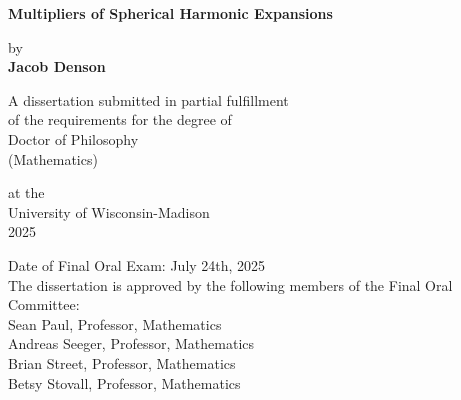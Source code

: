 
\begin{titlepage}
    \begin{center}
        \vspace*{1cm}
        \Huge
        \textbf{Multipliers of Spherical Harmonic Expansions}
    
        \vspace{0.5cm}

        \LARGE
        by\\
        \vspace{0.3em}
        \textbf{Jacob Denson}

        \vfill

        A dissertation submitted in partial fulfillment\\
        of the requirements for the degree of\\
        Doctor of Philosophy\\
        (Mathematics)\\
    
        \vspace{1.8cm}

        \Large
        at the\\University of Wisconsin-Madison\\
        2025\\

        \vspace{1.0cm}
        \begin{flushleft}
        \normalsize
        Date of Final Oral Exam: July 24th, 2025\\
        The dissertation is approved by the following members of the Final Oral Committee: \\
        \setlength{\parindent}{10ex}
        Sean Paul, Professor, Mathematics\\Andreas Seeger, Professor, Mathematics\\
        Brian Street, Professor, Mathematics\\Betsy Stovall, Professor, Mathematics\\
        \end{flushleft}
        
    \end{center}
    
\end{titlepage}